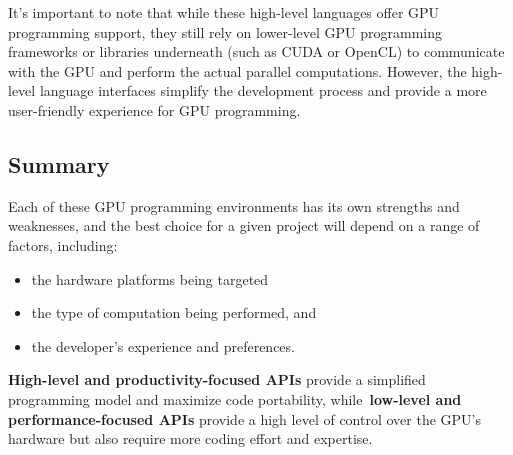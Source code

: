 \par
It's important to note that while these high-level languages offer GPU programming support, they still rely on lower-level GPU programming frameworks or libraries underneath (such as CUDA or OpenCL) to communicate with the GPU and perform the actual parallel computations.
However, the high-level language interfaces simplify the development process and provide a more user-friendly experience for GPU programming.




\subsection{Summary}


\par
Each of these GPU programming environments has its own strengths and weaknesses, and the best choice for a given project will depend on a range of factors, including:
\begin{itemize}
    \item the hardware platforms being targeted
    \item the type of computation being performed, and
    \item the developer’s experience and preferences.
\end{itemize}


\par
\textbf{High-level and productivity-focused APIs} provide a simplified programming model and maximize code portability, while~\textbf{low-level and performance-focused APIs} provide a high level of control over the GPU’s hardware but also require more coding effort and expertise.


